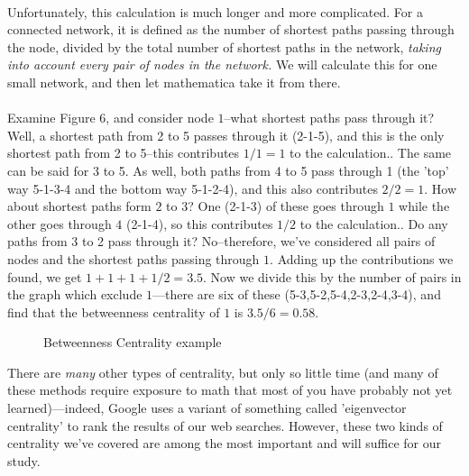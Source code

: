 \documentclass[12pt]{article}
\begin{document}
\\
Unfortunately, this calculation is much longer and more complicated. For a connected network, it is defined as the number of shortest paths passing through the node, divided by the total number of shortest paths in the network, \emph{taking into account every pair of nodes in the network.} We will calculate this for one small network, and then let mathematica take it from there. \\
\\
Examine Figure 6, and consider node $1$--what shortest paths pass through it? Well, a shortest path from 2 to 5 passes through it (2-1-5), and this is the only shortest path from 2 to 5--this contributes $1/1=1$ to the calculation.. The same can be said for 3 to 5. As well, both paths from 4 to 5 pass through 1 (the 'top' way 5-1-3-4 and the bottom way 5-1-2-4), and this also contributes $2/2=1$. How about shortest paths form $2$ to $3$? One (2-1-3) of these goes through $1$ while the other goes through $4$ (2-1-4), so this contributes $1/2$ to the calculation.. Do any paths from 3 to 2 pass through it? No--therefore, we've considered all pairs of nodes and the shortest paths passing through $1.$ Adding up the contributions we found, we get $1+1+1+1/2=3.5$. Now we divide this by the number of pairs in the graph which exclude $1$---there are six of these (5-3,5-2,5-4,2-3,2-4,3-4), and find that the betweenness centrality of $1$ is $3.5/6=0.58$.
\begin{figure}[htbp]
\begin{center}
\label{bw}
\caption{Betweenness Centrality example}
\end{center}
\end{figure}
There are \emph{many} other types of centrality, but only so little time (and many of these methods require exposure to math that most of you have probably not yet learned)---indeed, Google uses a variant of something called 'eigenvector centrality' to rank the results of our web searches. However, these two kinds of centrality we've covered are among the most important and will suffice for our study.
\end{document}
